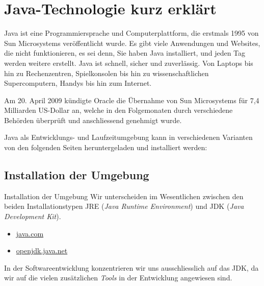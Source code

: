 \mode*

\setmonofont{Verdana}

\section{Java-Technologie kurz erklärt}
\label{sec:java-technologie}

Java ist eine Programmiersprache und Computerplattform, die erstmals 1995 von 
Sun Microsystems veröffentlicht wurde. Es gibt viele Anwendungen und
Websites, die nicht funktionieren, es sei denn, Sie haben Java installiert, 
und jeden Tag werden weitere erstellt. Java ist schnell, sicher und
zuverlässig. Von Laptops bis hin zu Rechenzentren, Spielkonsolen bis hin zu 
wissenschaftlichen Supercomputern, Handys bis hin zum Internet.

Am 20. April 2009 kündigte Oracle die Übernahme von Sun Microsystems für 
7,4 Milliarden US-Dollar an, welche in den Folgemonaten durch verschiedene
Behörden überprüft und anschliessend genehmigt wurde.

Java als Entwicklungs- und Laufzeitumgebung kann in verschiedenen Varianten
von den folgenden Seiten heruntergeladen und installiert werden:

\subsection{Installation der Umgebung}
\label{subsec:installation}

\begin{frame}{Installation der Umgebung}
	Wir unterscheiden im Wesentlichen zwischen den beiden Installationstypen
	JRE ({\em Java Runtime Environment}) und JDK ({\em Java 
	Development Kit}).
	
    \begin{itemize}
		\item \href{https://java.com}{java.com}   
		\item \href{https://openjdk.java.net}{openjdk.java.net}
    \end{itemize}
\end{frame}

In der Softwareentwicklung konzentrieren wir uns ausschliesslich auf das JDK,
da wir auf die vielen zusätzlichen {\em Tools} in der Entwicklung angewiesen
sind.
	
